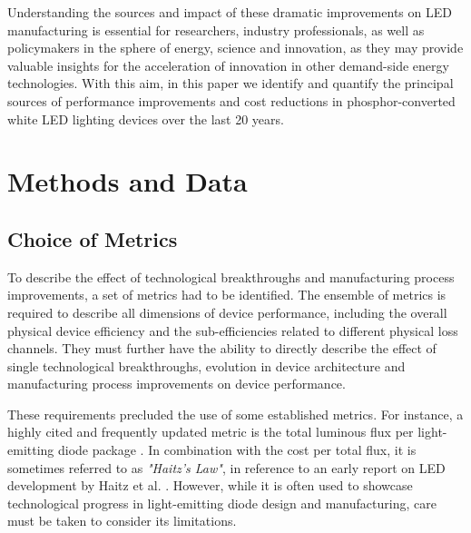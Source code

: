 \documentclass[a4paper,nocompress]{spie}  %
\begin{document}
    Understanding the sources and impact of these dramatic improvements on LED manufacturing is essential for researchers, industry professionals, as well as policymakers in the sphere of energy, science and innovation, as they may provide valuable insights for the acceleration of innovation in other demand-side energy technologies. With this aim, in this paper we identify and quantify the principal sources of performance improvements and cost reductions in phosphor-converted white LED lighting devices over the last 20 years. 

\section{Methods and Data}
\label{sec:methods}

\subsection{Choice of Metrics}

    To describe the effect of technological breakthroughs and manufacturing process improvements, a set of metrics had to be identified. The ensemble of metrics is required to describe all dimensions of device performance, including the overall physical device efficiency and the sub-efficiencies related to different physical loss channels. They must further have the ability to directly describe the effect of single technological breakthroughs, evolution in device architecture and manufacturing process improvements on device performance.
    
    These requirements precluded the use of some established metrics. For instance, a highly cited and frequently updated metric is the total luminous flux per light-emitting diode package \cite{Liu2009,haitz2011solid,cho2017white,Fontoynont2018}. In combination with the cost per total flux, it is sometimes referred to as \textit{"Haitz's Law"}, in reference to an early report on LED development by Haitz et al. \cite{haitz1999case}. However, while it is often used to showcase technological progress in light-emitting diode design and manufacturing, care must be taken to consider its limitations.
    
\end{document}
